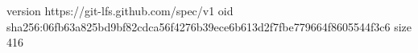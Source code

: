 version https://git-lfs.github.com/spec/v1
oid sha256:06fb63a825bd9bf82cdca56f4276b39ece6b613d2f7fbe779664f8605544f3c6
size 416

